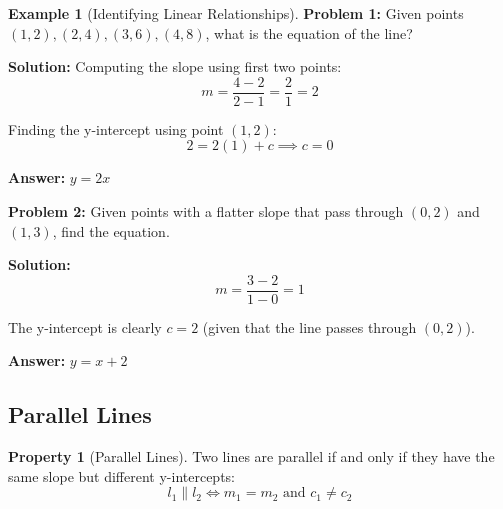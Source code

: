 \documentclass[12pt,a4paper]{article}
\theoremstyle{directpoint}
\theoremstyle{definition}
\newtheorem{example}{Example}[section]
\newtheorem{property}{Property}[section]
\begin{document}
\begin{example}[Identifying Linear Relationships]
\textbf{Problem 1:} Given points $(1, 2), (2, 4), (3, 6), (4, 8)$, what is the equation of the line?

\textbf{Solution:} 
Computing the slope using first two points:
\begin{equation}
m = \frac{4 - 2}{2 - 1} = \frac{2}{1} = 2
\end{equation}

Finding the y-intercept using point $(1, 2)$:
\begin{equation}
2 = 2(1) + c \implies c = 0
\end{equation}

\textbf{Answer:} $y = 2x$

\textbf{Problem 2:} Given points with a flatter slope that pass through $(0, 2)$ and $(1, 3)$, find the equation.

\textbf{Solution:}
\begin{equation}
m = \frac{3 - 2}{1 - 0} = 1
\end{equation}

The y-intercept is clearly $c = 2$ (given that the line passes through $(0, 2)$).

\textbf{Answer:} $y = x + 2$
\end{example}

\subsection{Parallel Lines}

\begin{property}[Parallel Lines]
Two lines are parallel if and only if they have the same slope but different y-intercepts:
\begin{equation}
l_1 \parallel l_2 \iff m_1 = m_2 \text{ and } c_1 \neq c_2
\end{equation}
\end{property}

\begin{center}
\end{center}
\end{document}
